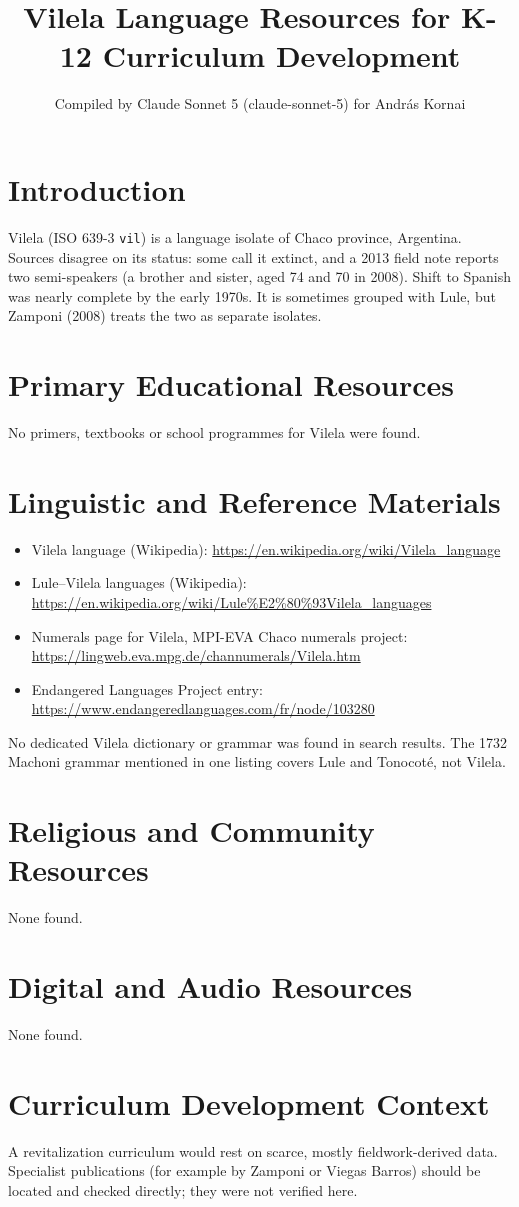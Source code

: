 \documentclass[12pt]{article}
\title{Vilela Language Resources for K-12 Curriculum Development}
\author{Compiled by Claude Sonnet 5 (claude-sonnet-5) for Andr\'as Kornai}
\date{}
\begin{document}
\maketitle

\section{Introduction}
Vilela (ISO 639-3 \texttt{vil}) is a language isolate of Chaco province, Argentina. Sources disagree on its status: some call it extinct, and a 2013 field note reports two semi-speakers (a brother and sister, aged 74 and 70 in 2008). Shift to Spanish was nearly complete by the early 1970s. It is sometimes grouped with Lule, but Zamponi (2008) treats the two as separate isolates.

\section{Primary Educational Resources}
No primers, textbooks or school programmes for Vilela were found.

\section{Linguistic and Reference Materials}
\begin{itemize}
\item Vilela language (Wikipedia): \url{https://en.wikipedia.org/wiki/Vilela_language}
\item Lule--Vilela languages (Wikipedia): \url{https://en.wikipedia.org/wiki/Lule%E2%80%93Vilela_languages}
\item Numerals page for Vilela, MPI-EVA Chaco numerals project: \url{https://lingweb.eva.mpg.de/channumerals/Vilela.htm}
\item Endangered Languages Project entry: \url{https://www.endangeredlanguages.com/fr/node/103280}
\end{itemize}
No dedicated Vilela dictionary or grammar was found in search results. The 1732 Machoni grammar mentioned in one listing covers Lule and Tonocot\'e, not Vilela.

\section{Religious and Community Resources}
None found.

\section{Digital and Audio Resources}
None found.

\section{Curriculum Development Context}
A revitalization curriculum would rest on scarce, mostly fieldwork-derived data. Specialist publications (for example by Zamponi or Viegas Barros) should be located and checked directly; they were not verified here.
\end{document}
